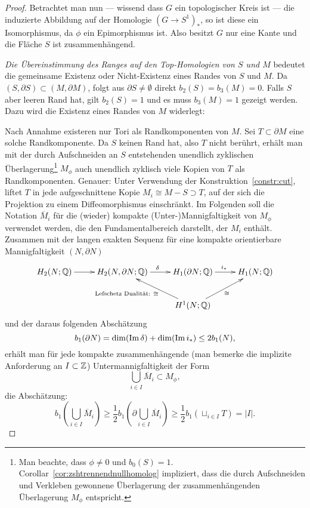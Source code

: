 \begin{proof}
	 Betrachtet man nun --- wissend dass $G$ ein topologischer Kreis ist --- die induzierte Abbildung auf der Homologie $(G\to S^1)_*$, so ist diese ein Isomorphismus, da $\phi$ ein Epimorphismus ist. Also besitzt $G$ nur eine Kante und die Fläche $S$ ist zusammenhängend.

	 \emph{Die Übereinstimmung des Ranges auf den Top-Homologien von $S$ und $M$} bedeutet die gemeinsame Existenz oder Nicht-Existenz eines Randes von $S$ und $M$. Da $(S,\partial S) \subset (M,\partial M)$, folgt aus $\partial S \neq \emptyset$ direkt $b_2(S)=b_3(M)=0$. Falls $S$ aber leeren Rand hat, gilt $b_2(S)=1$ und es muss $b_3(M)=1$ gezeigt werden. Dazu wird die Existenz eines Randes von $M$ widerlegt:

	 Nach Annahme existeren nur Tori als Randkomponenten von $M$. Sei $T \subset \partial M$ eine solche Randkomponente. Da $S$ keinen Rand hat, also $T$ nicht berührt, erhält man mit der durch Aufschneiden an $S$ entstehenden unendlich zyklischen Überlagerung\footnote{Man beachte, dass $\phi \neq 0$ und $b_0(S)=1$. Corollar~\ref{cor:zshtrennendnullhomolog} impliziert, dass die durch Aufschneiden und Verkleben gewonnene Überlagerung der zusammenhängenden Überlagerung $M_\phi$ entspricht.} $M_\phi$ auch unendlich zyklisch viele Kopien von $T$ als Randkomponenten. Genauer: Unter Verwendung der Konstruktion~\ref{constr:cut}, liftet $T$ in jede aufgeschnittene Kopie $M_i \cong M - S \supset T$, auf der sich die Projektion zu einem Diffeomorphismus einschränkt. Im Folgenden soll die Notation $\overline M_i$ für die (wieder) kompakte (Unter-)Mannigfaltigkeit von $M_\phi$ verwendet werden, die den Fundamentalbereich darstellt, der $M_i$ enthält. Zusammen mit der langen exakten Sequenz für eine kompakte orientierbare Mannigfaltigkeit $(N,\partial N)$
	\[
	 \begin{xy}
	 	\xymatrix{
	 	H_2(N;\QQ) \ar[r]&  H_2(N,\partial N ; \QQ) \ar[r]^\delta & H_1(\partial N;\QQ) \ar[r]^{i_*}& H_1(N;\QQ) \\
	 	& &H^1(N;\QQ) \ar[ru]_{\cong} \ar[lu]^{\text{Lefschetz Dualität: }\cong \qquad~}&}
	 \end{xy}
	 \] 
	 und der daraus folgenden Abschätzung
	 \[
	 	b_1(\partial N) = \dim(\operatorname{Im} \delta) + \dim(\operatorname{Im} i_*) \leq  2b_1(N),
	 \]
	 erhält man für jede kompakte zusammenhängende (man bemerke die implizite Anforderung an $I\subset \mathbb{Z}$) Untermannigfaltigkeit der Form 
	 \[
	  	\bigcup_{i\in I} \overline M_i \subset M_\phi ,
	  \]
	  die Abschätzung:
	  \[
	   	b_1(\bigcup_{i\in I} \overline M_i)\geq \frac{1}{2}b_1(\partial \bigcup_{i\in I} \overline M_i) \geq \frac{1}{2}b_1(\sqcup_{i \in I}T) = |I|.
	  \]



\end{proof}
